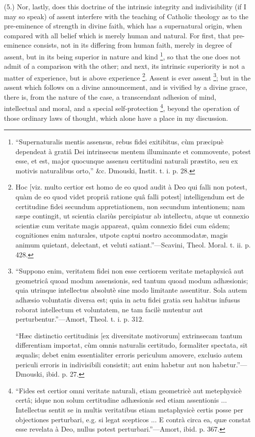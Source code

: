 (5.) Nor, lastly, does this doctrine of the intrinsic integrity and
indivisibility (if I may so speak) of assent interfere with the
teaching of Catholic theology as to the pre-eminence of strength in
divine faith, which has a supernatural origin, when compared with all
belief which is merely human and natural. For first, that pre-eminence
consists, not in its differing from human faith, merely in degree of
assent, but in its being superior in nature and kind \footnote{``Supernaturalis
mentis assensus, rebus fidei exitibitus, cùm præcipuè dependeat à
gratiâ Dei intrinsecus mentem illuminante et commovente, potest esse,
et est, major quocunque assensu certitudini naturali præstito, seu ex
motivis naturalibus orto,'' \&c. Dmouski, Instit. t. i. p. 28.}, so that the one does not admit of a comparison with the
other; and next, its intrinsic superiority is not a matter of
experience, but is above experience \footnote{Hoc [viz. multo
certior est homo de eo quod audit à Deo qui falli non potest, quàm
de eo quod videt propriâ ratione quâ falli potest] intelligendum est
de certitudine fidei secundum appretiationem, non secundum intentionem;
nam sæpe contingit, ut scientia clariùs percipiatur ab intellectu,
atque ut connexio scientiæ cum veritate magis appareat, quàm
connexio fidei cum eâdem; cognitiones enim naturales, utpote captui
nostro accommodatæ, magis animum quietant, delectant, et veluti
satiant.''—Scavini, Theol. Moral. t. ii. p. 428.}. Assent is ever assent \footnote{``Suppono
enim, veritatem fidei non esse certiorem veritate metaphysicâ aut
geometricâ quoad modum assensionis, sed tantum quoad modum
adhæsionis; quia utrinque intellectus absolutè sine modo limitante
assentitur. Sola autem adhæsio voluntatis diversa est; quia in actu
fidei gratia seu habitus infusus roborat intellectum et voluntatem, ne
tam facilè mutentur aut perturbentur.''—Amort, Theol. t. i. p.
312.

``Hæc distinctio certitudinis [ex diversitate motivorum]
extrinsecam tantum differentiam importat, cùm omnis naturalis
certitudo, formaliter spectata, sit æqualis; debet enim essentialiter
erroris periculum amovere, exclusio autem periculi erroris in
indivisibili consistit; aut enim habetur aut non habetur.''—Dmouski,
ibid. p. 27.};
but in the assent which follows on a divine announcement, and is
vivified by a divine grace, there is, from the nature of the case, a
transcendant adhesion of mind, intellectual and moral, and a special
self-protection \footnote{``Fides est
certior omni veritate naturali, etiam geometricè aut metephysicè
certâ; idque non solum certitudine adhæsionis sed etiam assentionis
... Intellectus sentit se in multis veritatibus etiam metaphysicè
certis posse per objectiones perturbari, e.g. si legat scepticos ...
E contrà circa ea, quæ constat esse revelata à Deo, nullus potest
perturbari.''—Amort, ibid. p. 367.}, beyond
the operation of those ordinary laws of thought, which alone have a
place in my discussion.

